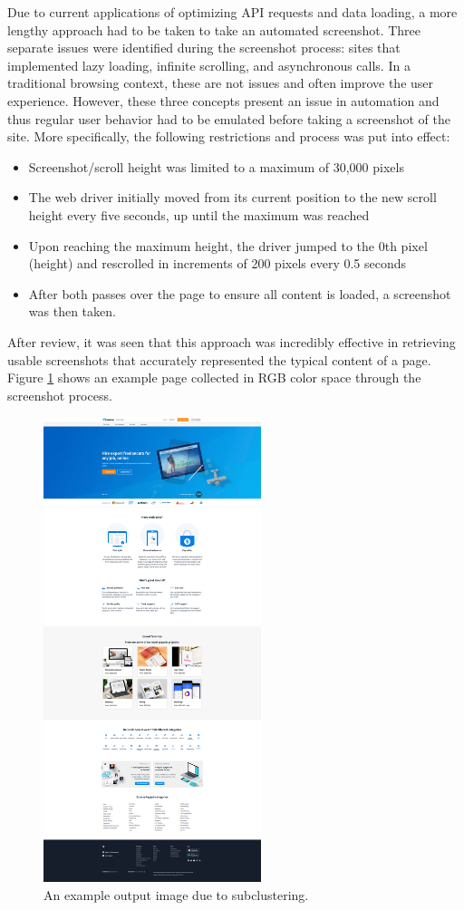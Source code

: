 \documentclass[conference]{IEEEtran}
\begin{document}
Due to current applications of optimizing API requests and data loading, a more lengthy approach had to be taken to take an automated screenshot. Three separate issues were identified during the screenshot process: sites that implemented lazy loading, infinite scrolling, and asynchronous calls. In a traditional browsing context, these are not issues and often improve the user experience. However, these three concepts present an issue in automation and thus regular user behavior had to be emulated before taking a screenshot of the site. More specifically, the following restrictions and process was put into effect:

\renewcommand{\labelitemi}{$\textendash$}
\begin{itemize}
\item Screenshot/scroll height was limited to a maximum of 30,000 pixels
\item The web driver initially moved from its current position to the new scroll height every five seconds, up until the maximum was reached
\item Upon reaching the maximum height, the driver jumped to the 0th pixel (height) and rescrolled in increments of 200 pixels every 0.5 seconds
\item After both passes over the page to ensure all content is loaded, a screenshot was then taken.
\end{itemize}

After review, it was seen that this approach was incredibly effective in retrieving usable screenshots that accurately represented the typical content of a page. Figure \ref{fig:rgb} shows an example page collected in RGB color space through the screenshot process.

\begin{figure}[!t]
\centering
\label{fig:rgb}
\includegraphics[width=2.5in]{media/freelancer_com_original.png}
\caption{An example output image due to subclustering.}
\end{figure}
\end{document}
